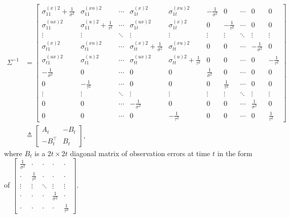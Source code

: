 \begin{align*} \Sigma^{-1} &=
\begin{bmatrix}
\sigma_{11}^{(x)2}+\frac{1}{\sigma^2} & \sigma_{11}^{(xu)2} & \cdots & \sigma_{1t}^{(x)2} & \sigma_{1t}^{(xu)2}  &  -\frac{1}{\sigma^2} & 0 & \cdots & 0 & 0\\
\sigma_{11}^{(ux)2}   & \sigma_{11}^{(u)2} +\frac{1}{\tau^2} & \cdots & \sigma_{1t}^{(ux)2} & \sigma_{1t}^{(x)2}  &  0 & -\frac{1}{\tau^2} & \cdots & 0 & 0 \\
\vdots & \vdots & \ddots & \vdots & \vdots & \vdots & \vdots &\ddots & \vdots & \vdots \\
\sigma_{t1}^{(x)2}   & \sigma_{t1}^{(xu)2} & \cdots & \sigma_{tt}^{(x)2} +\frac{1}{\sigma^2}  & \sigma_{tt}^{(xu)2}  &  0 & 0 & \cdots & -\frac{1}{\sigma^2} & 0 \\
\sigma_{t1}^{(ux)2}   & \sigma_{t1}^{(u)2} & \cdots & \sigma_{tt}^{(ux)2} & \sigma_{tt}^{(u)2} +\frac{1}{\tau^2}  &  0 & 0 & \cdots & 0 &-\frac{1}{\tau^2} \\
- \frac{1}{\sigma^2} & 0 & \cdots & 0 & 0 &  \frac{1}{\sigma^2} & 0 & \cdots & 0 & 0\\
0  & -\frac{1}{\tau^2}& \cdots & 0 & 0 &  0 &  \frac{1}{\tau^2} & \cdots & 0 & 0 \\
\vdots & \vdots & \ddots & \vdots & \vdots & \vdots & \vdots &\ddots & \vdots & \vdots \\
0 & 0& \cdots & -\frac{1}{\sigma^2}  &0&  0 & 0 & \cdots & \frac{1}{\sigma^2} & 0 \\
0 & 0 & \cdots & 0 & -\frac{1}{\tau^2}   &  0 & 0 & \cdots & 0 & \frac{1}{\tau^2}
\end{bmatrix} \\ 
& \triangleq \begin{bmatrix}
A_t& -B_t \\ -B_t^\top & B_t
\end{bmatrix},
\end{align*}
where $B_t$ is a $2t\times 2t$ diagonal matrix of observation errors at time $t$ in the form of $\begin{bmatrix}
\frac{1}{\sigma^2}& \cdot & \cdot &  \cdot  &  \cdot \\  \cdot & \frac{1}{\tau^2} & \cdot &  \cdot  &  \cdot  \\ 
\vdots & \vdots & \ddots & \vdots & \vdots \\
 \cdot  &  \cdot  & \cdot  & \frac{1}{\sigma^2}&  \cdot \\  \cdot  &  \cdot & \cdot  &  \cdot  & \frac{1}{\tau^2}
\end{bmatrix}$. 
